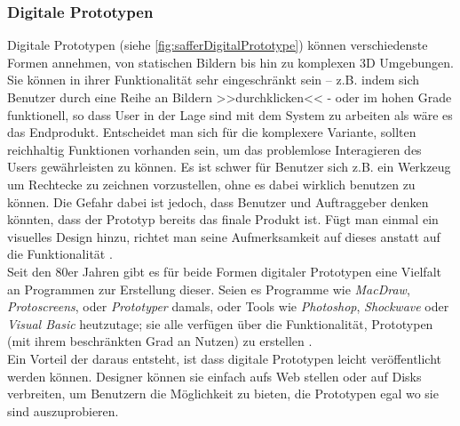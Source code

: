 \subsubsection{Digitale Prototypen} 
Digitale Prototypen (siehe \autoref{fig:safferDigitalPrototype}) können verschiedenste Formen annehmen, von statischen Bildern bis hin zu komplexen 3D Umgebungen. Sie können in ihrer Funktionalität sehr eingeschränkt sein – z.B. indem sich Benutzer durch eine Reihe an Bildern >>durchklicken<< - oder im hohen Grade funktionell, so dass User in der Lage sind mit dem System zu arbeiten als wäre es das Endprodukt. Entscheidet man sich für die komplexere Variante, sollten reichhaltig Funktionen vorhanden sein, um das problemlose Interagieren des Users gewährleisten zu können. Es ist schwer für Benutzer sich z.B. ein Werkzeug um Rechtecke zu zeichnen vorzustellen, ohne es dabei wirklich benutzen zu können. Die Gefahr dabei ist jedoch, dass Benutzer und Auftraggeber denken könnten, dass der Prototyp bereits das finale Produkt ist. Fügt man einmal ein visuelles Design hinzu, richtet man seine Aufmerksamkeit auf dieses anstatt auf die Funktionalität \citep{Saffer:2007}.\\
Seit den 80er Jahren gibt es für beide Formen digitaler Prototypen eine Vielfalt an Programmen zur Erstellung dieser. Seien es Programme wie \emph{MacDraw}, \emph{Protoscreens}, oder \emph{Prototyper} damals, oder Tools wie \emph{Photoshop}, \emph{Shockwave} oder \emph{Visual Basic} heutzutage; sie alle verfügen über die Funktionalität, Prototypen (mit ihrem beschränkten Grad an Nutzen) zu erstellen \citep{Miller-Jacobs:1991}. \\
Ein Vorteil der daraus entsteht, ist dass digitale Prototypen leicht veröffentlicht werden können. Designer können sie einfach aufs Web stellen oder auf Disks verbreiten, um Benutzern die Möglichkeit zu bieten, die Prototypen egal wo sie sind auszuprobieren. 

